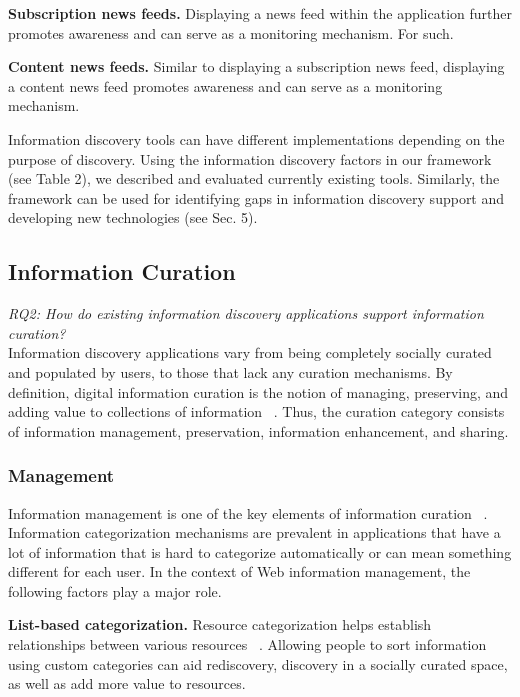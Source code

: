 \documentclass{casconpaper}
\begin{document}
{{\textbf{Subscription news feeds.} Displaying a news feed within the application further promotes awareness and can serve as a monitoring mechanism. For such. 

\textbf{Content news feeds.} Similar to displaying a subscription news feed, displaying a content news feed promotes awareness and can serve as a monitoring mechanism.

Information discovery tools can have different implementations depending on the purpose of discovery. Using the information discovery factors in our framework (see Table 2), we described and evaluated currently existing tools. Similarly, the framework can be used for identifying gaps in information discovery support and developing new technologies (see Sec. 5).   \\

} %

{\subsection{Information Curation}
\emph{RQ2: How do existing information discovery applications support information curation?}\\

Information discovery applications vary from being completely socially curated and populated by users, to those that lack any curation mechanisms. 
By definition, digital information curation is the notion of managing, preserving, and adding value to collections of information ~\cite{beagrie, wittaker}. Thus, the curation category consists of information management, preservation, information enhancement, and sharing.  
} %

{\subsubsection{Management}
Information management is one of the key elements of information curation ~\cite{beagrie, wittaker}. Information categorization mechanisms are prevalent in applications that have a lot of information that is hard to categorize automatically or can mean something different for each user. In the context of Web information management, the following factors play a major role.

\textbf{List-based categorization.} Resource categorization helps establish relationships between various resources ~\cite{beagrie, wittaker}. Allowing people to sort information using custom categories can aid rediscovery, discovery in a socially curated space, as well as add more value to resources.

}}
\end{document}
